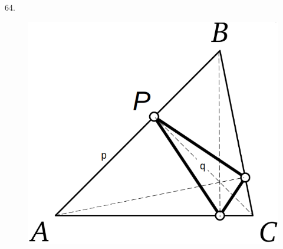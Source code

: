 \begin{problem}{64.}
\begin{figure}
        \hspace{0.1cm}
        \includegraphics[scale=0.14]{resources/oplossing643}
    \end{figure}
\end{problem}

\clearpage

